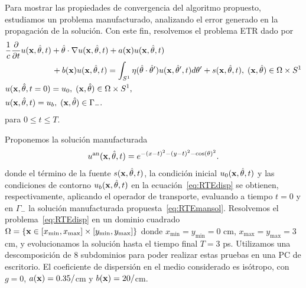 Para mostrar las propiedades de convergencia del algoritmo propuesto,
estudiamos un problema manufacturado, analizando el error generado en la propagación de 
la solución.
Con este fin, resolvemos el problema ETR dado por 
\begin{equation*}
\begin{split}
\begin{aligned}
&\frac{1}{c}\frac{\partial }{\partial t}u(\mathbf{x},\hat{\theta},t) + \hat{\theta} \cdot \nabla u(\mathbf{x},\hat{\theta},t)+a(\mathbf{x})u(\mathbf{x},\hat{\theta},t)  \\
&\quad \quad \quad  \quad \quad \; \;\,  +b(\mathbf{x})u(\mathbf{x},\hat{\theta},t) = \int_{S^1}\eta(\hat{\theta}\cdot\hat{\theta} ') 
u(\mathbf{x},\hat \theta',t) d\theta'+s(\mathbf{x},\hat{\theta},t),  \; (\mathbf{x},\hat{\theta})  \in \Omega\times S^1\\
&u(\mathbf{x},\hat{\theta},t=0)=u_0, \; (\mathbf{x},\hat{\theta})  \in \Omega\times S^1,  \\
&u(\mathbf{x},\hat{\theta},t)=u_b, \; (\mathbf{x},\hat{\theta}) \in \Gamma_-. \notag
\end{aligned}
\end{split}
\label{eq:RTEdisp}
\end{equation*}
para $0\leq t \leq T$. 

Proponemos la solución manufacturada
\begin{equation*}
u^{\text{an}}(\mathbf{x},\hat{\theta},t)=e^{-(x-t)^2-(y-t)^2-\cos(\theta)^2}.
\label{eq:RTEmansol}
\end{equation*}
donde el término de la fuente $s(\mathbf{x},\hat{\theta},t)$, 
la condición inicial $u_0(\mathbf{x},\hat{\theta},t)$ y las condiciones 
de contorno $u_b(\mathbf{x},\hat{\theta},t)$ en la ecuación~\eqref{eq:RTEdisp} 
se obtienen, respectivamente, aplicando el operador de transporte, 
evaluando a tiempo $t=0$ y en $\Gamma_-$ la solución manufacturada 
propuesta~\eqref{eq:RTEmansol}.
Resolvemos el problema~\eqref{eq:RTEdisp} en un dominio cuadrado 
$\Omega=\{ \mathbf{x} \in [x_{\text{min}},x_{\text{max}}]\times [y_{\text{min}},y_{\text{max}}] \}$
donde $x_{\text{min}}=y_{\text{min}}=0$ cm, $x_{\text{max}}=y_{\text{max}}=3$ cm, 
y evolucionamos la solución hasta el tiempo final $T=3$ ps. Utilizamos 
una descomposición de 8 subdominios para 
poder realizar estas pruebas en una PC de escritorio. 
El coeficiente de dispersión en el medio considerado es isótropo, 
con $g=0$, $a(\mathbf{x})=0.35/$cm y $b(\mathbf{x})=20/$cm. 


